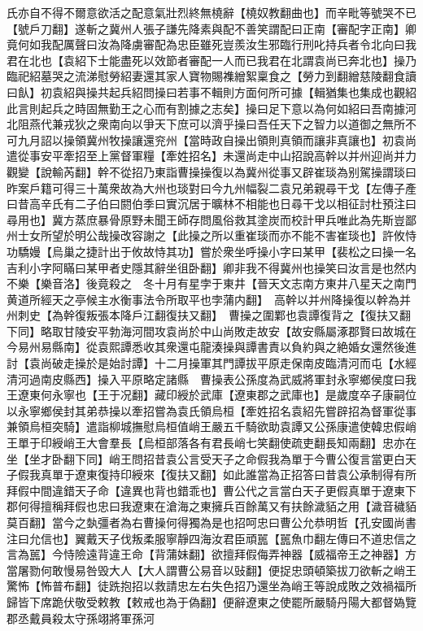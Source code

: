 氏亦自不得不爾意欲活之配意氣壯烈終無橈辭【橈奴教翻曲也】而辛毗等號哭不已【號戶刀翻】遂斬之冀州人張子謙先降素與配不善笑謂配曰正南【審配字正南】卿竟何如我配厲聲曰汝為降虜審配為忠臣雖死豈羨汝生邪臨行刑叱持兵者令北向曰我君在北也【袁紹下士能盡死以效節者審配一人而已我君在北謂袁尚已奔北也】操乃臨祀紹墓哭之流涕慰勞紹妻還其家人寶物賜襍繒絮稟食之【勞力到翻繒慈陵翻食讀曰飤】初袁紹與操共起兵紹問操曰若事不輯則方面何所可據【輯猶集也集成也觀紹此言則起兵之時固無勤王之心而有割據之志矣】操曰足下意以為何如紹曰吾南據河北阻燕代兼戎狄之衆南向以爭天下庶可以濟乎操曰吾任天下之智力以道御之無所不可九月詔以操領冀州牧操讓還兖州【當時政自操出領則真領而讓非真讓也】初袁尚遣從事安平牽招至上黨督軍糧【牽姓招名】未還尚走中山招說高幹以并州迎尚并力觀變【說輸芮翻】幹不從招乃東詣曹操操復以為冀州從事又辟崔琰為别駕操謂琰曰昨案戶籍可得三十萬衆故為大州也琰對曰今九州幅裂二袁兄弟親尋干戈【左傳子產曰昔高辛氏有二子伯曰閼伯季曰實沉居于曠林不相能也日尋干戈以相征討杜預注曰尋用也】冀方蒸庶暴骨原野未聞王師存問風俗救其塗炭而校計甲兵唯此為先斯豈鄙州士女所望於明公哉操改容謝之【此操之所以重崔琰而亦不能不害崔琰也】許攸恃功驕嫚【烏巢之捷計出于攸故恃其功】嘗於衆坐呼操小字曰某甲【裴松之曰操一名吉利小字阿瞞曰某甲者史隱其辭坐徂卧翻】卿非我不得冀州也操笑曰汝言是也然内不樂【樂音洛】後竟殺之　冬十月有星孛于東井【晉天文志南方東井八星天之南門黄道所經天之亭候主水衡事法令所取平也孛蒲内翻】　高幹以并州降操復以幹為并州刺史【為幹復叛張本降戶江翻復扶又翻】　曹操之圍鄴也袁譚復背之【復扶又翻下同】略取甘陵安平勃海河間攻袁尚於中山尚敗走故安【故安縣屬涿郡賢曰故城在今易州易縣南】從袁熙譚悉收其衆還屯龍湊操與譚書責以負約與之絶婚女還然後進討【袁尚破走操於是始討譚】十二月操軍其門譚拔平原走保南皮臨清河而屯【水經清河過南皮縣西】操入平原略定諸縣　曹操表公孫度為武威將軍封永寧鄉侯度曰我王遼東何永寧也【王于况翻】藏印綬於武庫【遼東郡之武庫也】是歲度卒子康嗣位以永寧鄉侯封其弟恭操以牽招嘗為袁氏領烏桓【牽姓招名袁紹先嘗辟招為督軍從事兼領烏桓突騎】遣詣柳城撫慰烏桓值峭王嚴五千騎欲助袁譚又公孫康遣使韓忠假峭王單于印綬峭王大會羣長【烏桓部落各有君長峭七笑翻使疏吏翻長知兩翻】忠亦在坐【坐才卧翻下同】峭王問招昔袁公言受天子之命假我為單于今曹公復言當更白天子假我真單于遼東復持印綬來【復扶又翻】如此誰當為正招答曰昔袁公承制得有所拜假中間違錯天子命【違異也背也錯乖也】曹公代之言當白天子更假真單于遼東下郡何得擅稱拜假也忠曰我遼東在滄海之東擁兵百餘萬又有扶餘濊貊之用【濊音穢貊莫百翻】當今之埶彊者為右曹操何得獨為是也招呵忠曰曹公允恭明哲【孔安國尚書注曰允信也】翼戴天子伐叛柔服寧靜四海汝君臣頑嚚【嚚魚巾翻左傳曰不道忠信之言為嚚】今恃險遠背違王命【背蒲妹翻】欲擅拜假侮弄神器【威福帝王之神器】方當屠勠何敢慢易咎毁大人【大人謂曹公易音以䜴翻】便捉忠頭頓築拔刀欲斬之峭王驚怖【怖普布翻】徒跣抱招以救請忠左右失色招乃還坐為峭王等說成敗之效禍福所歸皆下席跪伏敬受敕教【敕戒也為于偽翻】便辭遼東之使罷所嚴騎丹陽大都督媯覽郡丞戴員殺太守孫翊將軍孫河

